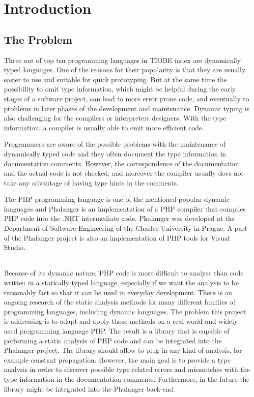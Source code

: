 \chapter{Introduction}

    \section{The Problem}
    
    Three out of top ten programming languages in TIOBE index\cite{tiobe} 
    are dynamically typed languages. One of the reasons for their popularity 
    is that they are usually easier to use and suitable for quick prototyping.
    But at the same time the possibility to omit type information, which might 
    be helpful during the early stages of a software project, can lead to more 
    error prone code, and eventually to problems in later phases of the 
    development and maintenance. Dynamic typing is also challenging for the 
    compilers or interpreters designers. With the type information, 
    a compiler is usually able to emit more efficient code.
    
    Programmers are aware of the possible problems with the maintenance of 
    dynamically typed code and they often document the type information in 
    documentation comments. However, the correspondence of the documentation 
    and the actual code is not checked, and moreover the compiler usually 
    does not take any advantage of having type hints in the comments.
    
    The PHP programming language is one of the mentioned popular dynamic 
    languages and Phalanger \cite{benda2006phalanger} is an implementation of a PHP compiler 
    that compiles PHP code into the .NET intermediate code. Phalanger was 
    developed at the Department of Software Engineering 
    of the Charles University in Prague. A part of the 
    Phalanger project is also an implementation of PHP tools 
    for Visual Studio.

    \subparagraph*{}    
    Because of its dynamic nature, PHP code is more difficult to analyse 
    than code written in a statically typed language, especially if we want the 
    analysis to be reasonably fast so that it can be used 
    in everyday development.  There is an ongoing research of the 
    static analysis methods for many different families of programming languages, 
    including dynamic languages. The problem this project is addressing 
    is to adapt and apply those methods on a real world and widely 
    used programming language PHP. The result is a library that is capable of 
    performing a static analysis of PHP code and can be integrated into 
    the Phalanger project. The library should allow to plug in any 
    kind of analysis, for example constant propagation. However, the main goal 
    is to provide a type analysis in order to discover possible type 
    related errors and mismatches with the type information in the 
    documentation comments. Furthermore, in the future the library 
    might be integrated into the Phalanger back-end.

